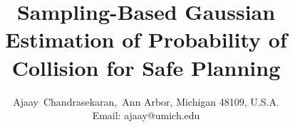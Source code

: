 \documentclass[journal]{IEEEtran}
\begin{document}
%
\title{Sampling-Based Gaussian Estimation of Probability of Collision for Safe Planning}
%
%
%

\author{Ajaay~Chandrasekaran,~Ann Arbor, Michigan 48109, U.S.A.\\Email: ajaay@umich.edu



}

% 
%
\end{document}
